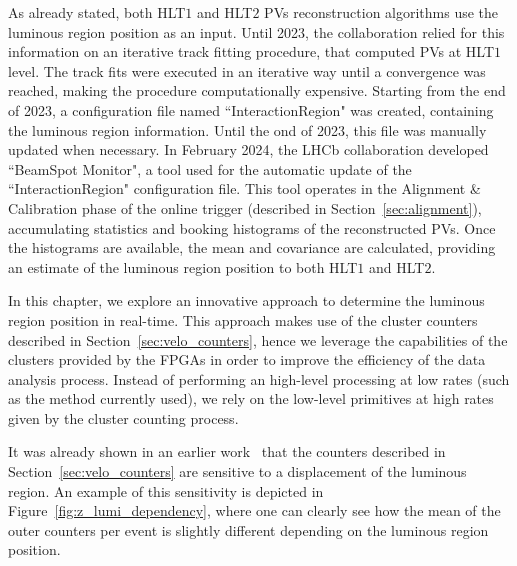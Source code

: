 As already stated, both HLT$1$ and HLT$2$ PVs reconstruction algorithms use the luminous region position as an input. Until 2023, the collaboration relied for this information on an iterative track fitting procedure, that computed PVs at HLT$1$ level. The track fits were executed in an iterative way until a convergence was reached, making the procedure computationally expensive. Starting from the end of 2023, a configuration file named ``InteractionRegion" was created, containing the luminous region information. Until the ond of 2023, this file was manually updated when necessary. In February 2024, the LHCb collaboration developed ``BeamSpot Monitor", a tool used for the automatic update of the ``InteractionRegion" configuration file.  This tool operates in the Alignment \& Calibration phase of the online trigger (described in Section~\ref{sec:alignment}), accumulating statistics and booking histograms of the reconstructed PVs. Once the histograms are available, the mean and covariance are calculated, providing an estimate of the luminous region position to both HLT$1$ and HLT$2$. 

In this chapter, we explore an innovative approach to determine the luminous region position in real-time.
This approach makes use of the cluster counters described in Section~\ref{sec:velo_counters}, hence we leverage the capabilities of the clusters provided by the FPGAs in order to improve the efficiency of the data analysis process. Instead of performing an high-level processing at low rates (such as the method currently used), we rely on the low-level primitives at high rates given by the cluster counting process.

It was already shown in an earlier work~\cite{dan} that the counters described in Section~\ref{sec:velo_counters} are sensitive to a displacement of the luminous region. An example of this sensitivity is depicted in Figure~\ref{fig:z_lumi_dependency}, where one can clearly see how the mean of the outer counters per event is slightly different depending on the luminous region position. 

